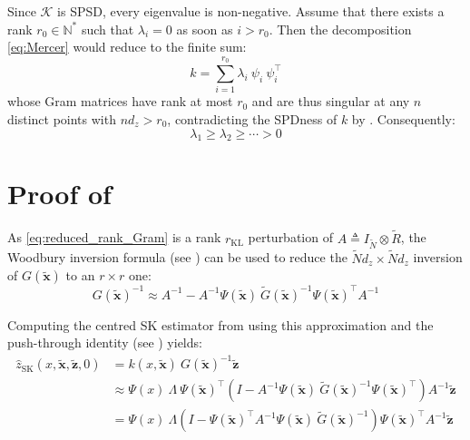 Since $\mathcal{K}$ is SPSD, every eigenvalue is non-negative. Assume that there exists a rank $r_0\in\mathbb{N}^*$ such that $\lambda_i=0$ as soon as $i>r_0$. Then the decomposition \eqref{eq:Mercer} would reduce to the finite sum:
\begin{equation}
	k=\sum_{i=1}^{r_0}\lambda_i\:\psi_i\:\psi_i^\top
\end{equation}
whose Gram matrices have rank at most $r_0$ and are thus singular at any $n$ distinct points with $nd_z>r_0$, contradicting the SPDness of $k$ by . Consequently:
\begin{equation}
	\lambda_1\geq\lambda_2\geq\cdots>0
\end{equation}

\section[Proof of Proposition 3.13]{Proof of }\label{sec:proof_reduced_rank_kriging}

As \eqref{eq:reduced_rank_Gram} is a rank $r_{\mathrm{KL}}$ perturbation of $A\triangleq I_{\tilde{N}}\otimes\tilde{R}$, the Woodbury inversion formula (see ) can be used to reduce the $\tilde{N}d_z\times\tilde{N}d_z$ inversion of $G(\tilde{\mathbf{x}})$ to an $r\times r$ one:
\begin{equation}
	G(\tilde{\mathbf{x}})^{-1}\approx A^{-1}-A^{-1}\Psi(\tilde{\mathbf{x}})\:\tilde{G}(\tilde{\mathbf{x}})^{-1}\Psi(\tilde{\mathbf{x}})^\top A^{-1}
\end{equation}

Computing the centred SK estimator from  using this approximation and the push-through identity (see ) yields:
\begin{equation}
	\begin{aligned}
	\hat{z}_{\mathrm{SK}}(x,\tilde{\mathbf{x}},\tilde{\mathbf{z}},0)&=k(x,\tilde{\mathbf{x}})\:G(\tilde{\mathbf{x}})^{-1}\tilde{\mathbf{z}}\\
	&\approx\Psi(x)\:\Lambda\:\Psi(\tilde{\mathbf{x}})^\top\left(I-A^{-1}\Psi(\tilde{\mathbf{x}})\:\tilde{G}(\tilde{\mathbf{x}})^{-1}\Psi(\tilde{\mathbf{x}})^\top\right)A^{-1}\tilde{\mathbf{z}}\\
	&=\Psi(x)\:\Lambda\left(I-\Psi(\tilde{\mathbf{x}})^\top A^{-1}\Psi(\tilde{\mathbf{x}})\:\tilde{G}(\tilde{\mathbf{x}})^{-1}\right)\Psi(\tilde{\mathbf{x}})^\top A^{-1}\tilde{\mathbf{z}}
	\end{aligned}\label{eq:z_s_up_to_tilde_G}
\end{equation}

